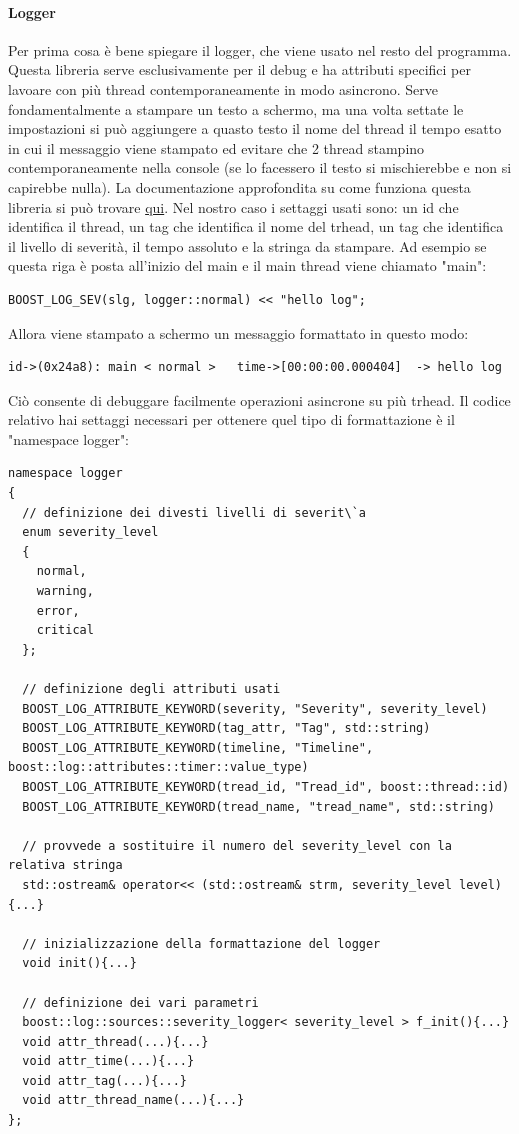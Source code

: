 \documentclass[10pt,a4paper]{article}
\begin{document}
\paragraph{Logger}
Per prima cosa \`e bene spiegare il logger, che viene usato nel resto del programma. Questa libreria serve esclusivamente per il debug e ha attributi specifici per lavoare con pi\`u thread contemporaneamente in modo asincrono. Serve fondamentalmente a stampare un testo a schermo, ma una volta settate le impostazioni si pu\`o aggiungere a quasto testo il nome del thread il tempo esatto in cui il messaggio viene stampato ed evitare che 2 thread stampino contemporaneamente nella console (se lo facessero il testo si mischierebbe e non si capirebbe nulla). La documentazione approfondita su come funziona questa libreria si pu\`o trovare \href{https://www.boost.org/doc/libs/1_69_0/libs/log/doc/html/index.html#log.moti}{qui}. Nel nostro caso i settaggi usati sono: un id che identifica il thread, un tag che identifica il nome del trhead, un tag che identifica il livello di severit\`a, il tempo assoluto e la stringa da stampare. Ad esempio se questa riga \`e posta all'inizio del main e il main thread viene chiamato "main":
%
\begin{lstlisting}[style=mycpp, caption=librerie usate, captionpos=b]
BOOST_LOG_SEV(slg, logger::normal) << "hello log";
\end{lstlisting}
%
Allora viene stampato a schermo un messaggio formattato in questo modo:
%
\begin{lstlisting}[style=myoutput, caption=librerie usate, captionpos=b]
id->(0x24a8): main < normal >   time->[00:00:00.000404]  -> hello log
\end{lstlisting}
%
Ci\`o consente di debuggare facilmente operazioni asincrone su pi\`u trhead.
Il codice relativo hai settaggi necessari per ottenere quel tipo di formattazione \`e il "namespace logger":
\begin{lstlisting}[style=mycpp, caption=namespace logger, captionpos=b]
namespace logger
{
  // definizione dei divesti livelli di severit\`a
  enum severity_level
  {
    normal,
    warning,
    error,
    critical
  };
  
  // definizione degli attributi usati
  BOOST_LOG_ATTRIBUTE_KEYWORD(severity, "Severity", severity_level)
  BOOST_LOG_ATTRIBUTE_KEYWORD(tag_attr, "Tag", std::string)
  BOOST_LOG_ATTRIBUTE_KEYWORD(timeline, "Timeline", boost::log::attributes::timer::value_type)
  BOOST_LOG_ATTRIBUTE_KEYWORD(tread_id, "Tread_id", boost::thread::id)
  BOOST_LOG_ATTRIBUTE_KEYWORD(tread_name, "tread_name", std::string)

  // provvede a sostituire il numero del severity_level con la relativa stringa
  std::ostream& operator<< (std::ostream& strm, severity_level level){...}

  // inizializzazione della formattazione del logger
  void init(){...}

  // definizione dei vari parametri
  boost::log::sources::severity_logger< severity_level > f_init(){...}
  void attr_thread(...){...}
  void attr_time(...){...}
  void attr_tag(...){...}
  void attr_thread_name(...){...}
};
\end{lstlisting}
\end{document}
